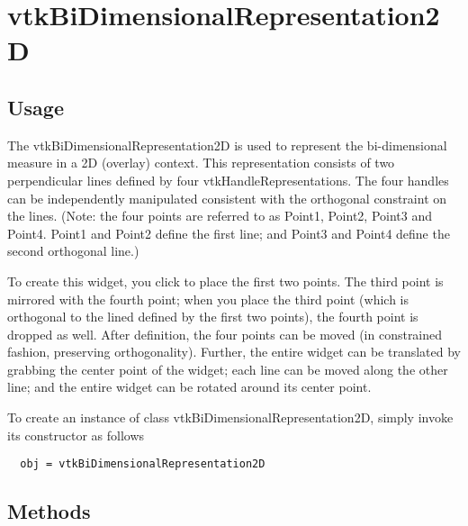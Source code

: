 \section{vtkBiDimensionalRepresentation2D}

\subsection{Usage}

 The vtkBiDimensionalRepresentation2D is used to represent the
 bi-dimensional measure in a 2D (overlay) context. This representation
 consists of two perpendicular lines defined by four
 vtkHandleRepresentations. The four handles can be independently
 manipulated consistent with the orthogonal constraint on the lines. (Note:
 the four points are referred to as Point1, Point2, Point3 and
 Point4. Point1 and Point2 define the first line; and Point3 and Point4
 define the second orthogonal line.)

 To create this widget, you click to place the first two points. The third
 point is mirrored with the fourth point; when you place the third point
 (which is orthogonal to the lined defined by the first two points), the
 fourth point is dropped as well. After definition, the four points can be
 moved (in constrained fashion, preserving orthogonality). Further, the
 entire widget can be translated by grabbing the center point of the widget;
 each line can be moved along the other line; and the entire widget can be
 rotated around its center point.

To create an instance of class vtkBiDimensionalRepresentation2D, simply
invoke its constructor as follows
\begin{verbatim}
  obj = vtkBiDimensionalRepresentation2D
\end{verbatim}
\subsection{Methods}

